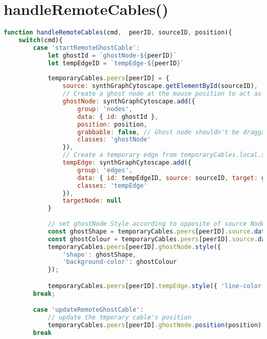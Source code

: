 \section{handleRemoteCables()}
\begin{lstlisting}[language=JavaScript, caption={Handles the rendering of temporary cables created by a remote peer, updating their position in real time. These updates are transmitted over a WebRTC data channel and are intentionally kept outside the Automerge sync protocol to avoid polluting the version history.}, label={lst:handleRemoteCables-function}]
function handleRemoteCables(cmd,  peerID, sourceID, position){   
    switch(cmd){    
        case 'startRemoteGhostCable':
            let ghostId = `ghostNode-${peerID}`
            let tempEdgeID = `tempEdge-${peerID}`
            
            temporaryCables.peers[peerID] = {
                source: synthGraphCytoscape.getElementById(sourceID),
                // Create a ghost node at the mouse position to act as the moving endpoint
                ghostNode: synthGraphCytoscape.add({
                    group: 'nodes',
                    data: { id: ghostId },
                    position: position,
                    grabbable: false, // Ghost node shouldn't be draggable
                    classes: 'ghostNode'
                }),
                // Create a temporary edge from temporaryCables.local.source to ghostNode
                tempEdge: synthGraphCytoscape.add({
                    group: 'edges',
                    data: { id: tempEdgeID, source: sourceID, target: ghostId },
                    classes: 'tempEdge'
                }),
                targetNode: null
            }
            
            // set ghostNode Style according to opposite of source Node
            const ghostShape = temporaryCables.peers[peerID].source.data('ghostCableShape') || 'ellipse';
            const ghostColour = temporaryCables.peers[peerID].source.data('ghostCableColour') || '#5C9AE3';
            temporaryCables.peers[peerID].ghostNode.style({
                'shape': ghostShape,
                'background-color': ghostColour
            });

            temporaryCables.peers[peerID].tempEdge.style({ 'line-color': '#228B22', 'line-style': 'dashed', 'source-arrow-shape': 'none' }); // Set peer temporary edge color
        break;

        case 'updateRemoteGhostCable':
            // update the tmporary cable's position
            temporaryCables.peers[peerID].ghostNode.position(position)
        break


\end{lstlisting}
